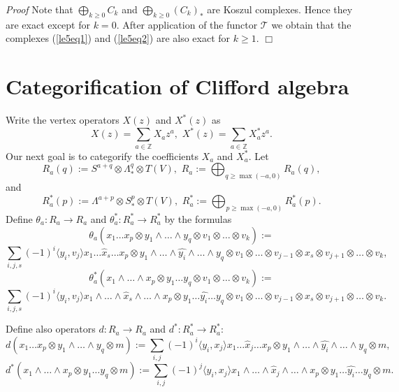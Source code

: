 \documentclass[11pt]{amsart}
\renewenvironment{proof}{ \emph{Proof}}{$\Box$}
\newcommand{\refeq}[1]{(\ref{#1})}
\begin{document}
\begin{proof}
Note that $\bigoplus_{k\geq 0}C_k$ and $\bigoplus_{k\geq 0}(C_k)_*$ are Koszul complexes. 
Hence they are exact except for $k=0$. After application of the functor $\mathcal T$ we obtain that the complexes \refeq{le5eq1} and \refeq{le5eq2} are also exact
for $k\geq 1$.
\end{proof}

\section {Categorification of Clifford algebra}
Write the vertex operators $X(z)$ and $X^*(z)$ as
$$X(z)=\sum_{a\in\mathbb Z}X_az^a,\,\,X^*(z)=\sum_{a\in\mathbb Z}X^*_az^a.$$
Our next goal is to categorify the coefficients $X_a$ and $X_a^*$.
Let 
$$R_a(q):=S^{a+q}\otimes \Lambda^q_*\otimes T(V),\,\,R_a:=\bigoplus_{q\geq\operatorname{max}(-a,0)} R_a(q),$$
and
$$R_a^*(p):=\Lambda^{a+p}\otimes S_*^{p}\otimes T(V),\,\,R^*_a:=\bigoplus_{p\geq\operatorname{max}(-a,0)} R_a^*(p).$$
Define $\theta_a:R_a\to R_a$ and $\theta_a^*:R^*_a\to R^*_a$ by the formulas
$$\theta_a(x_1\dots x_p\otimes y_1\wedge\dots\wedge y_q\otimes v_1\otimes\dots\otimes v_k):=$$
$$\sum_{i,j,s}(-1)^i\langle y_i,v_j\rangle x_1\dots\hat{x}_s\dots x_p\otimes y_1\wedge\dots\wedge\hat{y_i}\wedge\dots\wedge y_q\otimes
v_1\otimes\dots\otimes v_{j-1}\otimes x_s\otimes v_{j+1}\otimes\dots\otimes v_k,$$
$$\theta_a^*(x_1\wedge\dots\wedge x_p\otimes y_1\dots y_q\otimes v_1\otimes\dots\otimes v_k):=$$
$$\sum_{i,j,s}(-1)^i\langle y_i,v_j\rangle x_1\wedge\dots\wedge\hat{x}_s\wedge\dots\wedge x_p\otimes y_1\dots\hat{y_i}\dots y_q\otimes
v_1\otimes\dots\otimes v_{j-1}\otimes x_s\otimes v_{j+1}\otimes\dots\otimes v_k.$$

Define also operators $d:R_a\to R_a$ and
$d^*:R^*_a\to R^*_a$:
$$d(x_1\dots x_p\otimes y_1\wedge\dots\wedge y_q\otimes m):=\sum_{i,j} (-1)^i \langle y_i,x_j\rangle 
 x_1\dots\hat{x}_j\dots x_p\otimes y_1\wedge\dots\wedge\hat{y_i}\wedge\dots\wedge y_q\otimes m,$$
$$d^*(x_1\wedge\dots\wedge x_p\otimes y_1\dots y_q\otimes m):=
\sum_{i,j}(-1)^j \langle y_i,x_j\rangle x_1\wedge\dots\wedge\hat{x}_j\wedge\dots\wedge x_p\otimes y_1\dots\hat{y_i}\dots y_q\otimes m.$$
\end{document}
